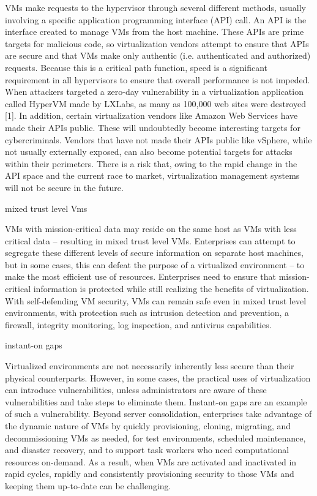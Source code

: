 VMs make requests to the hypervisor through several different methods, usually involving a specific application programming interface (API) call. An API is the interface created to manage VMs from the host machine. These APIs are prime targets for malicious code, so virtualization vendors attempt to ensure that APIs are secure and that VMs make only authentic (i.e. authenticated and authorized) requests. Because this is a critical path function, speed is a significant requirement in all hypervisors to ensure that overall performance is not impeded.
When attackers targeted a zero-day vulnerability in a virtualization application called HyperVM made by LXLabs, as many as 100,000 web sites were destroyed [1]. In addition, certain virtualization vendors like Amazon Web Services have made their APIs public. These will undoubtedly become interesting targets for cybercriminals. Vendors that have not made their APIs public like vSphere, while not usually externally exposed, can also become potential targets for attacks within their perimeters. There is a risk that, owing to the rapid change in the API space and the current race to market, virtualization management systems will not be secure in the future.

mixed trust level Vms

VMs with mission-critical data may reside on the same host as VMs with less critical data – resulting in mixed trust level VMs. Enterprises can attempt to segregate these different levels of secure information on separate host machines, but in some cases, this can defeat the purpose of a virtualized environment – to make the most efficient use of resources. Enterprises need to ensure that mission-critical information is protected while still realizing the benefits of virtualization. With self-defending VM security, VMs can remain safe even in mixed trust level environments, with protection such as intrusion detection and prevention, a firewall, integrity monitoring, log inspection, and antivirus capabilities.

instant-on gaps

Virtualized environments are not necessarily inherently less secure than their physical counterparts. However, in some cases, the practical uses of virtualization can introduce vulnerabilities, unless administrators are aware of these vulnerabilities and take steps to eliminate them. Instant-on gaps are an example of such a vulnerability.
Beyond server consolidation, enterprises take advantage of the dynamic nature of VMs by quickly provisioning, cloning, migrating, and decommissioning VMs as needed, for test environments, scheduled maintenance, and disaster recovery, and to support task workers who need computational resources on-demand. As a result, when VMs are activated and inactivated in rapid cycles, rapidly and consistently provisioning security to those VMs and keeping them up-to-date can be challenging.

